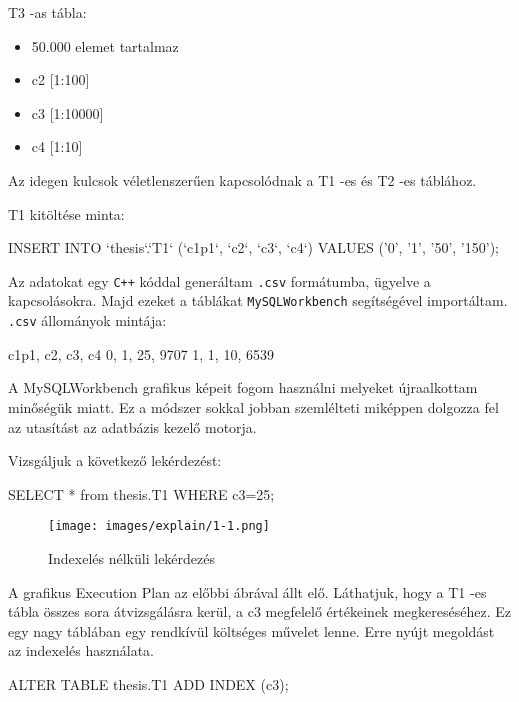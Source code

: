 T3 -as tábla:
\begin{itemize}   
\item 50.000 elemet tartalmaz
\item c2    [1:100]
\item c3    [1:10000]
\item c4    [1:10]
\end{itemize}
Az idegen kulcsok véletlenszerűen kapcsolódnak a T1 -es és T2 -es táblához.



T1 kitöltése minta:
\begin{python}
INSERT INTO `thesis`.`T1` (`c1p1`, `c2`, `c3`, `c4`)
VALUES ('0', '1', '50', '150');
\end{python}


Az adatokat egy \texttt{C++} kóddal generáltam \texttt{.csv} formátumba, ügyelve a kapcsolásokra. Majd ezeket a táblákat \texttt{MySQLWorkbench} segítségével importáltam. \texttt{.csv} állományok mintája:
\begin{python}
c1p1, c2, c3, c4
0, 1, 25, 9707
1, 1, 10, 6539
\end{python}
\newpage
{}

A MySQLWorkbench grafikus képeit fogom használni melyeket újraalkottam minőségük miatt. Ez a módszer sokkal jobban szemlélteti miképpen dolgozza fel az utasítást az adatbázis kezelő motorja.

Vizsgáljuk a következő lekérdezést:
\begin{python}
SELECT * from thesis.T1 WHERE c3=25; 
\end{python}
\begin{figure}[h!]
\centering
\texttt{[image: images/explain/1-1.png]}
\caption{Indexelés nélküli lekérdezés}
\label{fig:schema}
\end{figure}

A grafikus Execution Plan az előbbi ábrával állt elő. Láthatjuk, hogy a T1 -es tábla összes sora átvizsgálásra kerül, a c3 megfelelő értékeinek megkereséséhez. Ez egy nagy táblában egy rendkívül költséges művelet lenne. 
Erre nyújt megoldást az indexelés használata.

\begin{python} 
ALTER TABLE  thesis.T1  ADD INDEX (c3);
\end{python}

